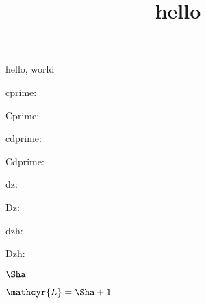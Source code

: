 \documentclass{amsart}
\title{hello}
\begin{document}
\maketitle

hello, world

cprime: \textcyr{\cprime}

Cprime: \textcyr{\Cprime}

cdprime: \textcyr{\cdprime}

Cdprime: \textcyr{\cdprime}

dz: \textcyr{\dz}

Dz: \textcyr{\Dz}

dzh: \textcyr{\dzh}

Dzh: \textcyr{\Dzh}

$\Sha$

$\mathcyr{L} = \Sha + 1$

\end{document}
